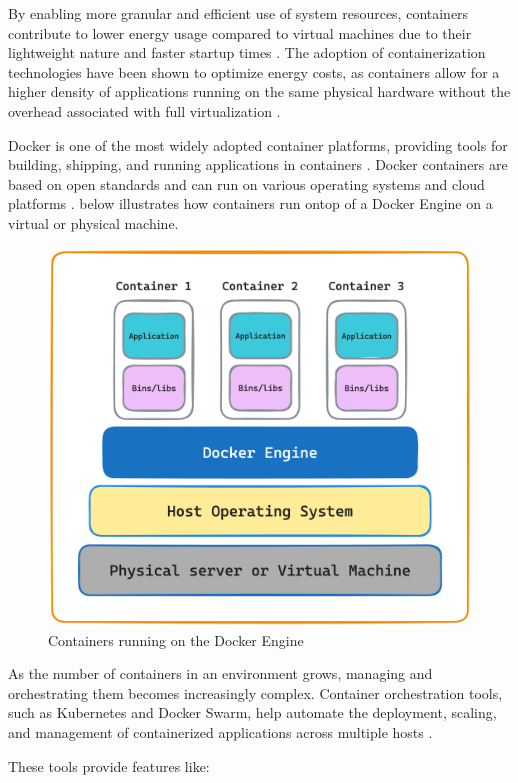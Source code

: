 \documentclass[
  table]{report}
\begin{document}
By enabling more granular and efficient use of system resources,
containers contribute to lower energy usage compared to virtual machines
due to their lightweight nature and faster startup times
\citep{shirinbabPerformanceEvaluationContainers2020}. The adoption of
containerization technologies have been shown to optimize energy costs,
as containers allow for a higher density of applications running on the
same physical hardware without the overhead associated with full
virtualization
\citep{cuadrado-corderoComparativeExperimentalAnalysis2018}.

Docker is one of the most widely adopted container platforms, providing
tools for building, shipping, and running applications in containers
\citep{merkelDockerLightweightLinux2014}. Docker containers are based on
open standards and can run on various operating systems and cloud
platforms \citep{sergeevDockerContainerPerformance2022}.
 below illustrates how containers run ontop of a
Docker Engine on a virtual or physical machine.

\begin{figure}[H]
\centering
  \includegraphics[width=0.7\columnwidth]{assets/3.3-container-figure.png}
  \caption{Containers running on the Docker Engine}
  \label{container-figure}
\end{figure}

As the number of containers in an environment grows, managing and
orchestrating them becomes increasingly complex. Container orchestration
tools, such as Kubernetes and Docker Swarm, help automate the
deployment, scaling, and management of containerized applications across
multiple hosts \citep{burnsBorgOmegaKubernetes2016}.

These tools provide features like:
\end{document}
